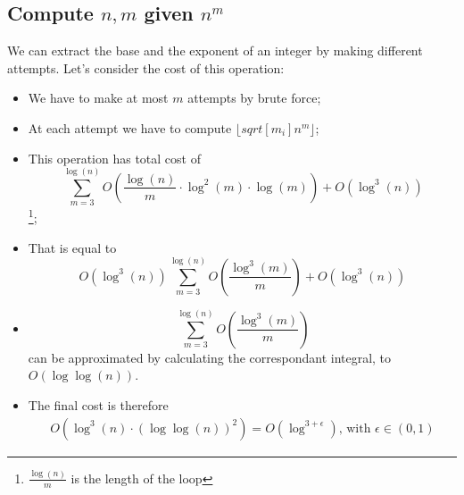 \subsection{Compute $n, m$ given $n^{m}$}
We can extract the base and the exponent of an integer by making different attempts.\newline
Let's consider the cost of this operation:
\begin{itemize}
    \item We have to make at most $m$ attempts by brute force;
    \item At each attempt we have to compute $\lfloor sqrt[m_{i}]{n^{m}} \rfloor$;
    \item This operation has total cost of \[\sum_{m=3}^{\operatorname{log}(n)} O(\frac{\operatorname{log}(n)}{m} \cdot \operatorname{log}^{2}(m) \cdot \operatorname{log}(m)) + O(\operatorname{log}^{3}(n))\]\footnote{$\frac{\operatorname{log}(n)}{m}$ is the length of the loop};
    \item That is equal to \[O(\operatorname{log}^{3}(n)) \sum_{m=3}^{\operatorname{log}(n)} O(\frac{\operatorname{log}^{3}(m)}{m}) + O(\operatorname{log}^{3}(n))\]
    \item \[\sum_{m=3}^{\operatorname{log}(n)} O(\frac{\operatorname{log}^{3}(m)}{m})\] can be approximated by calculating the correspondant integral, to $O(\operatorname{log}\operatorname{log}(n))$.
    \item The final cost is therefore
    \begin{align*}
        O(\operatorname{log}^{3}(n) \cdot(\operatorname{log}\operatorname{log}(n))^{2})
        = O(\operatorname{log}^{3 + \epsilon}) \text{, with } \epsilon \in (0,1)
    \end{align*}
\end{itemize}

